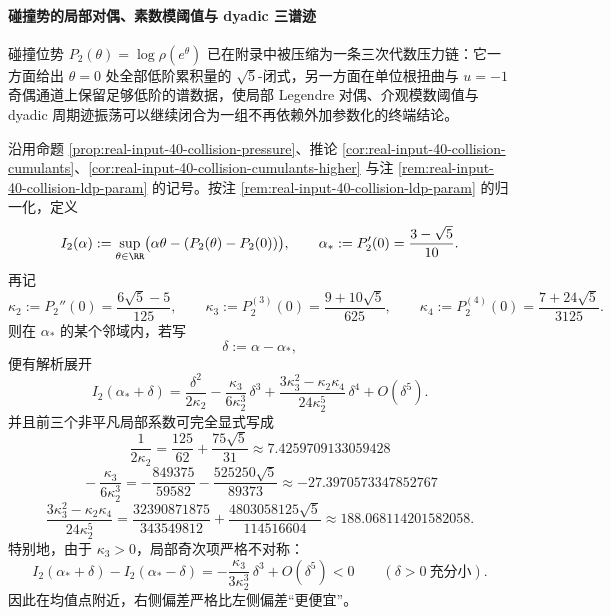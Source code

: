 \paragraph{碰撞势的局部对偶、素数模阈值与 dyadic 三谱迹}
碰撞位势 \(P_2(\theta)=\log\rho(e^\theta)\) 已在附录中被压缩为一条三次代数压力链：它一方面给出 \(\theta=0\) 处全部低阶累积量的 \(\sqrt5\)-闭式，另一方面在单位根扭曲与 \(u=-1\) 奇偶通道上保留足够低阶的谱数据，使局部 Legendre 对偶、介观模数阈值与 dyadic 周期迹振荡可以继续闭合为一组不再依赖外加参数化的终端结论。

\begin{theorem}\label{thm:xi-real-input-40-collision-rate-cramer-edgeworth}
沿用命题 \ref{prop:real-input-40-collision-pressure}、推论 \ref{cor:real-input-40-collision-cumulants}、\ref{cor:real-input-40-collision-cumulants-higher} 与注 \ref{rem:real-input-40-collision-ldp-param} 的记号。按注 \ref{rem:real-input-40-collision-ldp-param} 的归一化，定义
\[
I_2(\alpha):=\sup_{\theta\in\RR}\bigl(\alpha\theta-(P_2(\theta)-P_2(0))\bigr),
\qquad
\alpha_*:=P_2'(0)=\frac{3-\sqrt5}{10}.
\]
再记
\[
\kappa_2:=P_2''(0)=\frac{6\sqrt5-5}{125},\qquad
\kappa_3:=P_2^{(3)}(0)=\frac{9+10\sqrt5}{625},\qquad
\kappa_4:=P_2^{(4)}(0)=\frac{7+24\sqrt5}{3125}.
\]
则在 \(\alpha_*\) 的某个邻域内，若写
\[
\delta:=\alpha-\alpha_*,
\]
便有解析展开
\[
\boxed{\;
I_2(\alpha_*+\delta)
=
\frac{\delta^2}{2\kappa_2}
-\frac{\kappa_3}{6\kappa_2^3}\,\delta^3
+\frac{3\kappa_3^2-\kappa_2\kappa_4}{24\kappa_2^5}\,\delta^4
+O(\delta^5).\;}
\]
并且前三个非平凡局部系数可完全显式写成
\[
\boxed{\;
\frac{1}{2\kappa_2}
=
\frac{125}{62}+\frac{75\sqrt5}{31}
\approx 7.4259709133059428\;}
\]
\[
\boxed{\;
-\frac{\kappa_3}{6\kappa_2^3}
=
-\frac{849375}{59582}-\frac{525250\sqrt5}{89373}
\approx -27.3970573347852767\;}
\]
\[
\boxed{\;
\frac{3\kappa_3^2-\kappa_2\kappa_4}{24\kappa_2^5}
=
\frac{32390871875}{343549812}
+\frac{4803058125\sqrt5}{114516604}
\approx 188.068114201582058.\;}
\]
特别地，由于 \(\kappa_3>0\)，局部奇次项严格不对称：
\[
\boxed{\;
I_2(\alpha_*+\delta)-I_2(\alpha_*-\delta)
=
-\frac{\kappa_3}{3\kappa_2^3}\,\delta^3+O(\delta^5)
<0
\qquad(\delta>0\ \text{充分小}).\;}
\]
因此在均值点附近，右侧偏差严格比左侧偏差“更便宜”。
\end{theorem}
